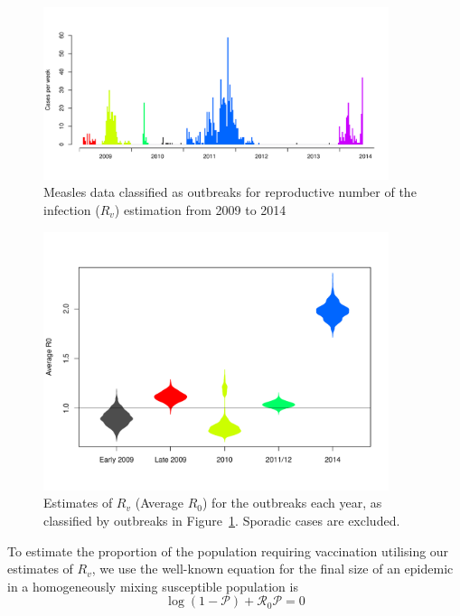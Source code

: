 \documentclass{article}
\newcommand{\Pe}{\mathcal{P}}
\newcommand{\Ro}{\mathcal{R}_0}
\begin{document}
\begin{figure}
     \centering
     \includegraphics[width=0.9\textwidth]{outbreaks_for_R0.pdf}
     \caption{Measles data classified as outbreaks for reproductive number of the infection ($R_v$) estimation from 2009 to 2014}
     \label{fig:outbreaks}
\end{figure}

\begin{figure}
     \centering
     \includegraphics[width=0.9\textwidth]{averageR0.pdf}
     \caption{Estimates of $R_v$ (Average $R_0$) for the outbreaks each year, as classified by outbreaks in Figure~\ref{fig:outbreaks}. Sporadic cases are excluded.}
     \label{fig:r0}
\end{figure}

To estimate the proportion of the population requiring vaccination utilising our estimates of $R_v$, we use the well-known equation for the final size of an epidemic in a homogeneously mixing susceptible population is \citep{diekmann13}
\begin{equation} \label{eq:eqn1}
\log\left(1-\Pe\right)+\Ro\Pe=0
\end{equation}
\end{document}
